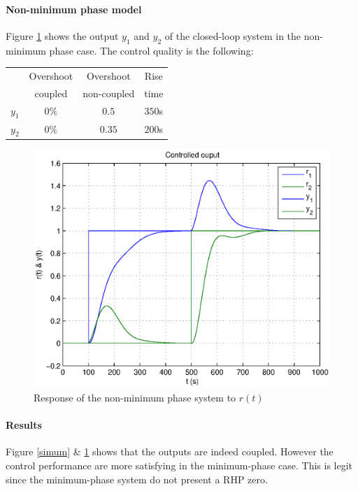 \paragraph{Non-minimum phase model}

Figure \ref{simunm} shows the output $y_1$ and $y_2$ of the closed-loop system in the non-minimum phase case. 
The control quality is the following: 
\begin{center}
\begin{tabular}{|c|ccc|}
    \hline
    & Overshoot& Overshoot& Rise\\ 
    & coupled & non-coupled & time \\
    \hline
    $y_1$ & $0\%$ & $0.5$ & $350$s  \\
    $y_2$ & $0\%$ & $0.35$ & $200$s  \\
    \hline
\end{tabular}
\end{center}

\begin{figure}[h!t]
    \includegraphics[width=\columnwidth]{fig/controlledouputnm.eps}
    \caption{Response of the non-minimum phase system to $r(t)$}
    \label{simunm}
\end{figure}

\paragraph{Results}

Figure \ref{simum} \& \ref{simunm} shows that the outputs are indeed coupled. 
However the control performance are more satisfying in the minimum-phase case. This is legit since the minimum-phase system do not present a RHP zero.
